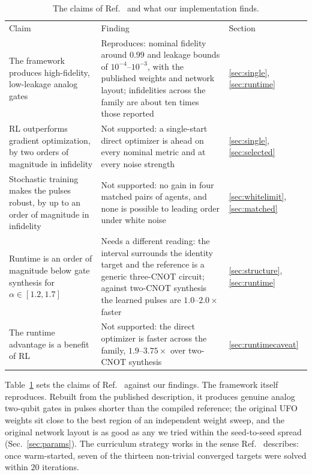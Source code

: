 \documentclass[aps,prx,twocolumn,superscriptaddress,nofootinbib,amsmath,amssymb,floatfix]{revtex4-2}
\begin{document}
\begin{table}[t]
\caption{The claims of Ref.~\cite{Niu2019} and what our implementation finds.}
\label{tab:claims}
\begin{ruledtabular}
\begin{tabular}{p{}p{}p{}}
Claim & Finding & Section \\
\colrule
The framework produces high-fidelity, low-leakage analog gates &
Reproduces: nominal fidelity around $0.99$ and leakage bounds of $10^{-4}$--$10^{-3}$, with the published
weights and network layout; infidelities across the family are about ten times those reported &
\ref{sec:single}, \ref{sec:runtime} \\
RL outperforms gradient optimization, by two orders of magnitude in infidelity &
Not supported: a single-start direct optimizer is ahead on every nominal metric and at every noise
strength &
\ref{sec:single}, \ref{sec:selected} \\
Stochastic training makes the pulses robust, by up to an order of magnitude in infidelity &
Not supported: no gain in four matched pairs of agents, and none is possible to leading order under white
noise &
\ref{sec:whitelimit}, \ref{sec:matched} \\
Runtime is an order of magnitude below gate synthesis for $\alpha\in[1.2,1.7]$ &
Needs a different reading: the interval surrounds the identity target and the reference is a generic
three-CNOT circuit; against two-CNOT synthesis the learned pulses are $1.0$--$2.0\times$ faster &
\ref{sec:structure}, \ref{sec:runtime} \\
The runtime advantage is a benefit of RL &
Not supported: the direct optimizer is faster across the family, $1.9$--$3.75\times$ over two-CNOT
synthesis &
\ref{sec:runtimecaveat} \\
\end{tabular}
\end{ruledtabular}
\end{table}

Table~\ref{tab:claims} sets the claims of Ref.~\cite{Niu2019} against our findings. The framework itself
reproduces. Rebuilt from the published description, it produces genuine analog two-qubit gates in pulses
shorter than the compiled reference; the original UFO weights sit close to the best region of an
independent weight sweep, and the original network layout is as good as any we tried within the
seed-to-seed spread (Sec.~\ref{sec:params}). The curriculum strategy works in the sense
Ref.~\cite{Niu2019} describes: once warm-started, seven of the thirteen non-trivial converged targets
were solved within $20$ iterations.
\end{document}
